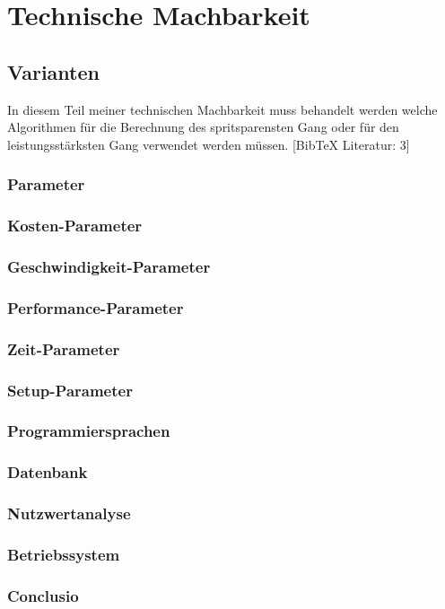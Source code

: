 
\chapter {Technische Machbarkeit}
\section {Varianten}
In diesem Teil meiner technischen Machbarkeit muss behandelt werden welche Algorithmen für die Berechnung des spritsparensten Gang oder für den leistungsstärksten Gang verwendet werden müssen.
[BibTeX Literatur: 3]
\subsection {Parameter}

\subsection {Kosten-Parameter}

\subsection {Geschwindigkeit-Parameter}

\subsection {Performance-Parameter}

\subsection {Zeit-Parameter}

\subsection {Setup-Parameter}

\subsection {Programmiersprachen}
\subsection {Datenbank}
\subsection {Nutzwertanalyse}
\subsection {Betriebssystem}
\subsection {Conclusio}

